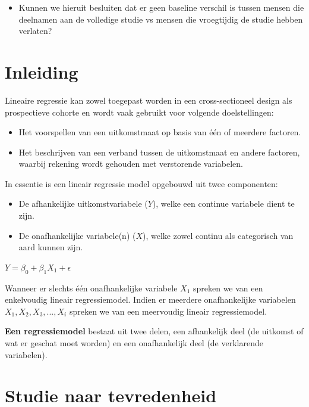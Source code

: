 \documentclass[
]{book}
\providecommand{\tightlist}{%
  \setlength{\itemsep}{0pt}\setlength{\parskip}{0pt}}
\theoremstyle{definition}
\theoremstyle{definition}
\theoremstyle{definition}
\theoremstyle{definition}
\theoremstyle{remark}
\begin{document}
\begin{itemize}
\tightlist
\item
  Kunnen we hieruit besluiten dat er geen baseline verschil is tussen mensen die deelnamen aan de volledige studie vs mensen die vroegtijdig de studie hebben verlaten?
\end{itemize}

\hypertarget{inleiding-1}{%
\section*{Inleiding}\label{inleiding-1}}


Lineaire regressie kan zowel toegepast worden in een cross-sectioneel design als prospectieve cohorte en wordt vaak gebruikt voor volgende doelstellingen:

\begin{itemize}
\tightlist
\item
  Het voorspellen van een uitkomstmaat op basis van één of meerdere factoren.
\item
  Het beschrijven van een verband tussen de uitkomstmaat en andere factoren, waarbij rekening wordt gehouden met verstorende variabelen.
\end{itemize}

In essentie is een lineair regressie model opgebouwd uit twee componenten:

\begin{itemize}
\tightlist
\item
  De afhankelijke uitkomstvariabele (\(Y\)), welke een continue variabele dient te zijn.
\item
  De onafhankelijke variabele(n) (\(X\)), welke zowel continu als categorisch van aard kunnen zijn.
\end{itemize}

\(Y = \beta_0 + \beta_1 X_1 + \epsilon\)

Wanneer er slechts één onafhankelijke variabele \(X_1\) spreken we van een enkelvoudig lineair regressiemodel. Indien er meerdere onafhankelijke variabelen \(X_1, X_2, X_3,..., X_i\) spreken we van een meervoudig lineair regressiemodel.

\textbf{Een regressiemodel} bestaat uit twee delen, een afhankelijk deel (de uitkomst of wat er geschat moet worden) en een onafhankelijk deel (de verklarende variabelen).

\hypertarget{studie-naar-tevredenheid-1}{%
\section*{Studie naar tevredenheid}\label{studie-naar-tevredenheid-1}}
\end{document}
